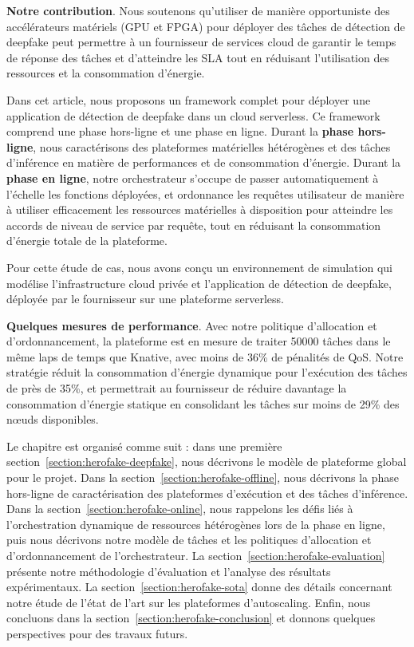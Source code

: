 \textbf{Notre contribution}. Nous soutenons qu'utiliser de manière opportuniste des accélérateurs matériels (GPU et FPGA) pour déployer des tâches de détection de deepfake peut permettre à un fournisseur de services cloud de garantir le temps de réponse des tâches et d'atteindre les SLA tout en réduisant l'utilisation des ressources et la consommation d'énergie.

Dans cet article, nous proposons un framework complet pour déployer une application de détection de deepfake dans un cloud serverless. Ce framework comprend une phase hors-ligne et une phase en ligne. Durant la \textbf{phase hors-ligne}, nous caractérisons des plateformes matérielles hétérogènes et des tâches d'inférence en matière de performances et de consommation d'énergie. Durant la \textbf{phase en ligne}, notre orchestrateur s'occupe de passer automatiquement à l'échelle les fonctions déployées, et ordonnance les requêtes utilisateur de manière à utiliser efficacement les ressources matérielles à disposition pour atteindre les accords de niveau de service par requête, tout en réduisant la consommation d'énergie totale de la plateforme.

Pour cette étude de cas, nous avons conçu un environnement de simulation qui modélise l'infrastructure cloud privée et l'application de détection de deepfake, déployée par le fournisseur sur une plateforme serverless.

\textbf{Quelques mesures de performance}. Avec notre politique d'allocation et d'ordonnancement, la plateforme est en mesure de traiter 50000 tâches dans le même laps de temps que Knative, avec moins de 36\% de pénalités de QoS. Notre stratégie réduit la consommation d'énergie dynamique pour l'exécution des tâches de près de 35\%, et permettrait au fournisseur de réduire davantage la consommation d'énergie statique en consolidant les tâches sur moins de 29\% des nœuds disponibles.

Le chapitre est organisé comme suit : dans une première section~\ref{section:herofake-deepfake}, nous décrivons le modèle de plateforme global pour le projet. Dans la section~\ref{section:herofake-offline}, nous décrivons la phase hors-ligne de caractérisation des plateformes d'exécution et des tâches d'inférence. Dans la section~\ref{section:herofake-online}, nous rappelons les défis liés à l'orchestration dynamique de ressources hétérogènes lors de la phase en ligne, puis nous décrivons notre modèle de tâches et les politiques d'allocation et d'ordonnancement de l'orchestrateur. La section~\ref{section:herofake-evaluation} présente notre méthodologie d'évaluation et l'analyse des résultats expérimentaux. La section~\ref{section:herofake-sota} donne des détails concernant notre étude de l'état de l'art sur les plateformes d'autoscaling. Enfin, nous concluons dans la section~\ref{section:herofake-conclusion} et donnons quelques perspectives pour des travaux futurs.

